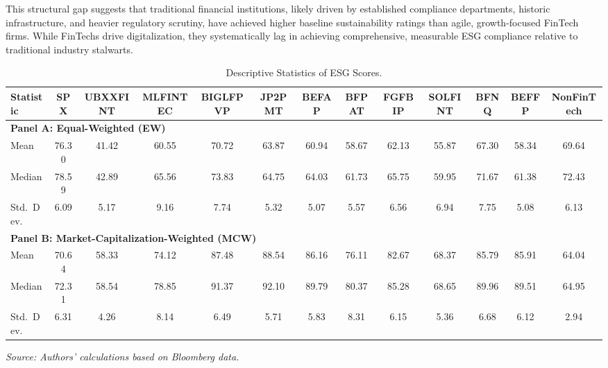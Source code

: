 \documentclass[12pt]{article}
\begin{document}
This structural gap suggests that traditional financial institutions, likely driven by established compliance departments, historic infrastructure, and heavier regulatory scrutiny, have achieved higher baseline sustainability ratings than agile, growth-focused FinTech firms. While FinTechs drive digitalization, they systematically lag in achieving comprehensive, measurable ESG compliance relative to traditional industry stalwarts.

\begin{table}[htbp]
\centering
\caption{Descriptive Statistics of ESG Scores.}\label{tab:esg}
\begin{adjustbox}{max width=\textwidth}
\begin{tabular}{lcccccccccccc}
\toprule
Statistic & SPX & UBXXFINT & MLFINTEC & BIGLFPVP & JP2PMT & BEFAP & BFPAT & FGFBIP & SOLFINT & BFNQ & BEFFP & NonFinTech \\
\midrule
\multicolumn{13}{l}{\textbf{Panel A: Equal-Weighted (EW)}} \\
\midrule
Mean & 76.30 & 41.42 & 60.55 & 70.72 & 63.87 & 60.94 & 58.67 & 62.13 & 55.87 & 67.30 & 58.34 & 69.64 \\
Median & 78.59 & 42.89 & 65.56 & 73.83 & 64.75 & 64.03 & 61.73 & 65.75 & 59.95 & 71.67 & 61.38 & 72.43 \\
Std.\ Dev. & 6.09 & 5.17 & 9.16 & 7.74 & 5.32 & 5.07 & 5.57 & 6.56 & 6.94 & 7.75 & 5.08 & 6.13 \\
\midrule
\multicolumn{13}{l}{\textbf{Panel B: Market-Capitalization-Weighted (MCW)}} \\
\midrule
Mean & 70.64 & 58.33 & 74.12 & 87.48 & 88.54 & 86.16 & 76.11 & 82.67 & 68.37 & 85.79 & 85.91 & 64.04 \\
Median & 72.31 & 58.54 & 78.85 & 91.37 & 92.10 & 89.79 & 80.37 & 85.28 & 68.65 & 89.96 & 89.51 & 64.95 \\
Std.\ Dev. & 6.31 & 4.26 & 8.14 & 6.49 & 5.71 & 5.83 & 8.31 & 6.15 & 5.36 & 6.68 & 6.12 & 2.94 \\
\bottomrule
\end{tabular}
\end{adjustbox}
\vspace{2pt}
{\footnotesize \textit{Source: Authors' calculations based on Bloomberg data.}}
\end{table}
\end{document}
